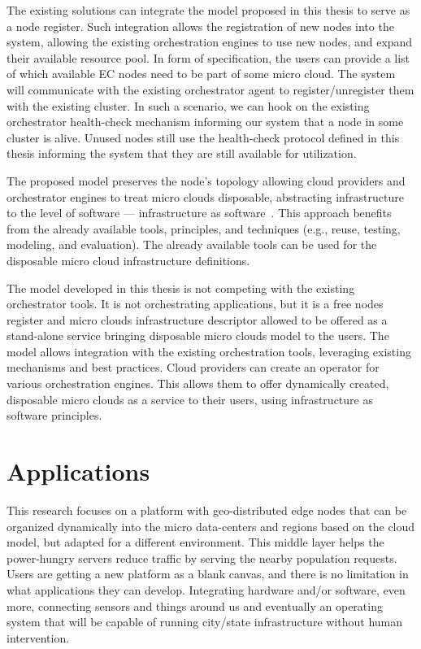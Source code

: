 The existing solutions can integrate the model proposed in this thesis to serve as a node register. Such integration allows the registration of new nodes into the system, allowing the existing orchestration engines to use new nodes, and expand their available resource pool. In form of specification, the users can provide a list of which available EC nodes need to be part of some micro cloud. The system will communicate with the existing orchestrator agent to register/unregister them with the existing cluster. In such a scenario, we can hook on the existing orchestrator health-check mechanism informing our system that a node in some cluster is alive. Unused nodes still use the health-check protocol defined in this thesis informing the system that they are still available for utilization.

The proposed model preserves the node's topology allowing cloud providers and orchestrator engines to treat micro clouds disposable, abstracting infrastructure to the level of software --- infrastructure as software~{\cite{Fitzgerald}}. This approach benefits from the already available tools, principles, and techniques (e.g., reuse, testing, modeling, and evaluation). The already available tools can be used for the disposable micro cloud infrastructure definitions.

The model developed in this thesis is not competing with the existing orchestrator tools. It is not orchestrating applications, but it is a free nodes register and micro clouds infrastructure descriptor allowed to be offered as a stand-alone service bringing disposable micro clouds model to the users. The model allows integration with the existing orchestration tools, leveraging existing mechanisms and best practices. Cloud providers can create an operator for various orchestration engines. This allows them to offer dynamically created, disposable micro clouds as a service to their users, using infrastructure as software principles.
%
%
\section{Applications}\label{sec:app}
%
This research focuses on a platform with geo-distributed edge nodes that can be organized dynamically into the micro data-centers and regions based on the cloud model, but adapted for a different environment. This middle layer helps the power-hungry servers reduce traffic by serving the nearby population requests. Users are getting a new platform as a blank canvas, and there is no limitation in what applications they can develop. Integrating hardware and/or software, even more, connecting sensors and things around us and eventually an operating system that will be capable of running city/state infrastructure without human intervention.


